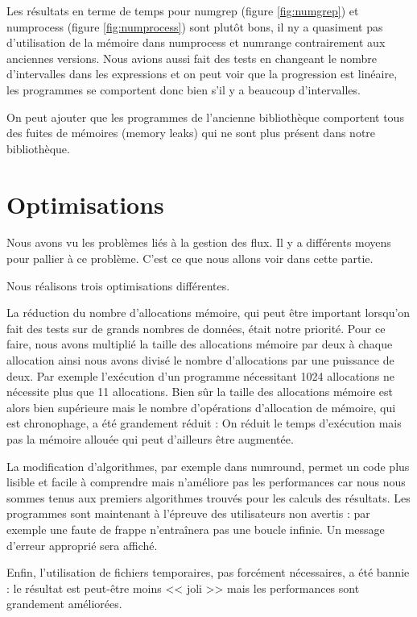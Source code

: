 Les r\'esultats en terme de temps pour numgrep (figure \ref{fig:numgrep}) et numprocess (figure \ref{fig:numprocess}) sont plut\^ot bons, il ny a quasiment pas d'utilisation de la m\'emoire dans numprocess et numrange contrairement aux anciennes versions. 
Nous avions aussi fait des tests en changeant le nombre d'intervalles dans les expressions et on peut voir que la progression est lin\'eaire, les programmes se comportent donc bien s'il y a beaucoup d'intervalles.

On peut ajouter que les programmes de l'ancienne biblioth\`eque comportent tous des fuites de m\'emoires (memory leaks) qui ne sont plus pr\'esent 
dans notre biblioth\`eque.

\section{Optimisations}

Nous avons vu les probl\`emes li\'es \`a la gestion des flux. Il y a diff\'erents moyens pour pallier \`a ce probl\`eme.
C'est ce que nous allons voir dans cette partie.

Nous r\'ealisons trois optimisations diff\'erentes.

La r\'eduction du nombre d'allocations m\'emoire, qui peut \^etre important lorsqu'on fait des tests sur de grands nombres de donn\'ees, \'etait notre priorit\'e.
Pour ce faire, nous avons multipli\'e la taille des allocations m\'emoire par deux \`a chaque allocation ainsi nous avons divis\'e le nombre d'allocations par une puissance de deux.
Par exemple l'ex\'ecution d'un programme n\'ecessitant 1024 allocations ne n\'ecessite plus que 11 allocations. Bien s\^ur la taille des allocations m\'emoire est alors bien 
sup\'erieure mais le nombre d'op\'erations d'allocation de m\'emoire, qui est chronophage, a \'et\'e grandement r\'eduit :
On r\'eduit le temps d'ex\'ecution mais pas la m\'emoire allou\'ee qui peut d'ailleurs \^etre augment\'ee.

La modification d'algorithmes, par exemple dans numround, permet un code plus lisible et facile \`a comprendre mais n'am\'eliore pas les performances car nous nous sommes tenus aux premiers algorithmes trouv\'es pour les calculs des r\'esultats.
Les programmes sont maintenant \`a l'\'epreuve des utilisateurs non avertis : par exemple une faute de frappe n'entra\^inera pas une boucle infinie. Un message d'erreur appropri\'e sera affich\'e.

Enfin, l'utilisation de fichiers temporaires, pas forc\'ement n\'ecessaires, a \'et\'e bannie : le r\'esultat est peut-\^etre moins << joli >> mais les performances sont grandement am\'elior\'ees.

